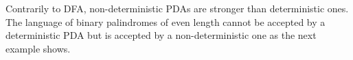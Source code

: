 

\setcounter{section}{6}
\setcounter{subsection}{1}
\setcounter{dfn}{4}


Contrarily to DFA, non-deterministic PDAs are stronger than deterministic ones.
The language of binary palindromes of even length cannot be accepted by a deterministic PDA
but is accepted by a non-deterministic one as the next example shows.



